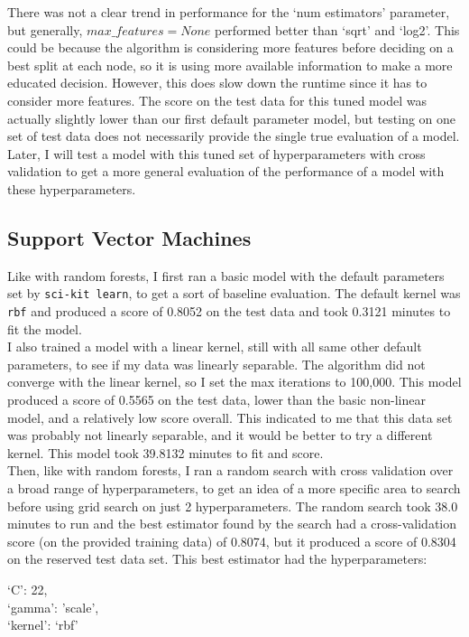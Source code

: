 \documentclass{article}
\begin{document}
There was not a clear trend in performance for the `num estimators' parameter, but generally, $max\_features=None$ performed better than `sqrt' and `log2'. This could be because the algorithm is considering more features before deciding on a best split at each node, so it is using more available information to make a more educated decision. However, this does slow down the runtime since it has to consider more features. The score on the test data for this tuned model was actually slightly lower than our first default parameter model, but testing on one set of test data does not necessarily provide the single true evaluation of a model. Later, I will test a model with this tuned set of hyperparameters with cross validation to get a more general evaluation of the performance of a model with these hyperparameters.
\subsection{Support Vector Machines}
Like with random forests, I first ran a basic model with the default parameters set by \texttt{sci-kit learn}, to get a sort of baseline evaluation. The default kernel was \texttt{rbf} and produced a score of 0.8052 on the test data and took 0.3121 minutes to fit the model.
\\I also trained a model with a linear kernel, still with all same other default parameters, to see if my data was linearly separable. The algorithm did not converge with the linear kernel, so I set the max iterations to 100,000. This model produced a score of 0.5565 on the test data, lower than the basic non-linear model, and a relatively low score overall. This indicated to me that this data set was probably not linearly separable, and it would be better to try a different kernel. This model took 39.8132 minutes to fit and score.
\\Then, like with random forests, I ran a random search with cross validation over a broad range of hyperparameters, to get an idea of a more specific area to search before using grid search on just 2 hyperparameters. The random search took 38.0 minutes to run and the best estimator found by the search had a cross-validation score (on the provided training data) of 0.8074, but it produced a score of 0.8304 on the reserved test data set. This best estimator had the hyperparameters: 
\begin{center}
`C': 22, 
\\`gamma': 'scale', 
\\`kernel': `rbf'
\end{center}
\end{document}
